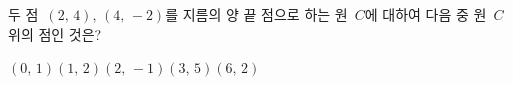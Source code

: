 두 점~$(2,\,4)$, $(4,\,-2)$를 지름의 양 끝 점으로 하는 원~$C$에 대하여 다음 중 원~$C$ 위의 점인 것은?
\begin{choices32}{$(0,\,1)$}{$(1,\,2)$}{$(2,\,-1)$}{$(3,\,5)$}{$(6,\,2)$}\end{choices32}
